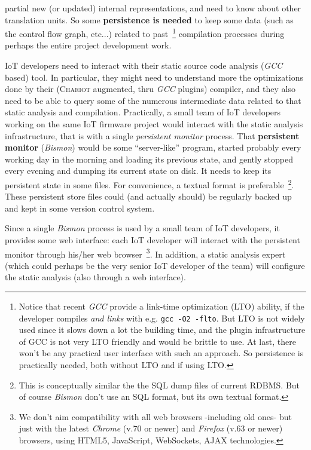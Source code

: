 partial new (or updated) internal representations, and need to know
about other translation units. So some \textbf{persistence is needed}
to keep some data (such as the control flow graph, etc...) related to
past~\footnote{Notice that recent \emph{GCC} provide a link-time
  optimization (LTO) ability, if the developer compiles \emph{and
    links} with e.g. \texttt{gcc -O2 -flto}. But LTO is not widely
  used since it slows down a lot the building time, and the plugin
  infrastructure of GCC is not very LTO friendly and would be brittle
  to use. At last, there won't be any practical user interface with
  such an approach. So persistence is practically needed, both without
  LTO and if using LTO.}  compilation processes during perhaps the
entire project development work.

IoT developers need to interact with their static source code analysis
(\emph{GCC} based) tool. In particular, they might need to understand
more the optimizations done by their (\textsc{Chariot} augmented, thru
\emph{GCC} plugins) compiler, and they also need to be able to query
some of the numerous intermediate data related to that static analysis
and compilation. Practically, a small team of IoT developers working
on the same IoT firmware project would interact with the static
analysis infrastructure, that is with a single \emph{persistent
  monitor} process. That \textbf{persistent monitor} (\emph{Bismon})
would be some ``server-like'' program, started probably every working
day in the morning and loading its previous state, and gently stopped
every evening and dumping its current state on disk. It needs to keep
its persistent state in some files. For convenience, a textual format
is preferable~\footnote{This is conceptually similar the the SQL dump
  files of current RDBMS. But of course \emph{Bismon} don't use an SQL
  format, but its own textual format.}. These persistent store files
could (and actually should) be regularly backed up and kept in some
version control system.

Since a single \emph{Bismon} process is used by a small team of IoT
developers, it provides some web interface: each
IoT developer will interact with the persistent monitor through his/her
web  browser~\footnote{We don't aim compatibility with
  all web browsers -including old ones- but just with the latest
  \emph{Chrome} (v.70 or newer) and \emph{Firefox} (v.63 or newer)
  browsers, using HTML5, JavaScript, WebSockets, AJAX
  technologies.}. In addition, a static analysis expert (which could
perhaps be the very senior IoT developer of the team) will configure
the static analysis (also through a web interface).


